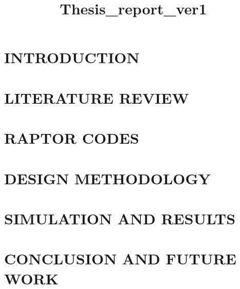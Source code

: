 \documentclass[12pt,letterpaper]{report}
\begin{document}
\doublespacing
\title{Thesis_report_ver1}

\thesistitlepage
\thesisapprovalpage
\thesisdedicationpage
\thesisacknowledgmentspage
\thesisvitapage  %
\thesisabstract
\doublespacing
\tableofcontents

\listoffigures


\clearpage
\chapter{\normalsize INTRODUCTION}
\label{chap:1}


\clearpage
\chapter{\normalsize LITERATURE REVIEW}
\label{chap:2}


\clearpage
\chapter{\normalsize RAPTOR CODES}
\label{chap:3}


\clearpage
\chapter{\normalsize DESIGN METHODOLOGY}
\label{chap:4}


\clearpage
\chapter{\normalsize SIMULATION AND RESULTS}
\label{chap:5}


\clearpage
\chapter{\normalsize CONCLUSION AND FUTURE WORK}
\label{chap:6}


\clearpage


 \appendix


%

 

\clearpage
 \newpage

 \setcounter{equation}{0}  \setcounter{table}{0}  \setcounter{subsection}{0}
 \renewcommand{\thefigure}{A.\arabic{figure}}
 \renewcommand{\thechapter}{A}%


 \clearpage
{}


\end{document}
